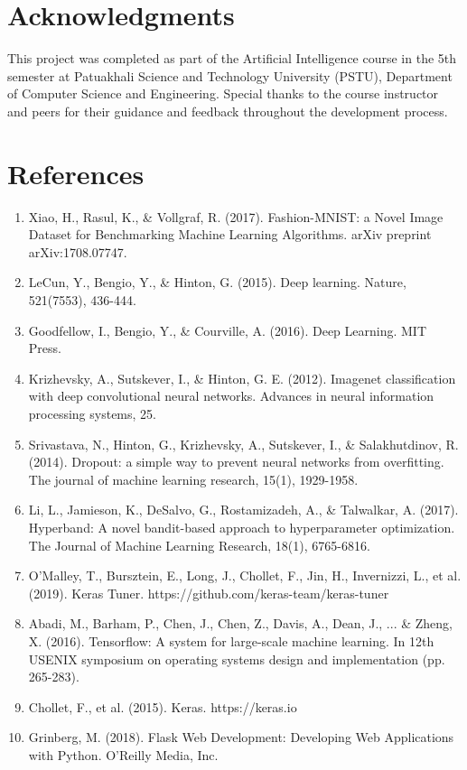 \documentclass[12pt,a4paper]{article}
\begin{document}
\section*{Acknowledgments}

This project was completed as part of the Artificial Intelligence course in the 5th semester at Patuakhali Science and Technology University (PSTU), Department of Computer Science and Engineering. Special thanks to the course instructor and peers for their guidance and feedback throughout the development process.

\section*{References}

\begin{enumerate}
    \item Xiao, H., Rasul, K., \& Vollgraf, R. (2017). Fashion-MNIST: a Novel Image Dataset for Benchmarking Machine Learning Algorithms. arXiv preprint arXiv:1708.07747.
    
    \item LeCun, Y., Bengio, Y., \& Hinton, G. (2015). Deep learning. Nature, 521(7553), 436-444.
    
    \item Goodfellow, I., Bengio, Y., \& Courville, A. (2016). Deep Learning. MIT Press.
    
    \item Krizhevsky, A., Sutskever, I., \& Hinton, G. E. (2012). Imagenet classification with deep convolutional neural networks. Advances in neural information processing systems, 25.
    
    \item Srivastava, N., Hinton, G., Krizhevsky, A., Sutskever, I., \& Salakhutdinov, R. (2014). Dropout: a simple way to prevent neural networks from overfitting. The journal of machine learning research, 15(1), 1929-1958.
    
    \item Li, L., Jamieson, K., DeSalvo, G., Rostamizadeh, A., \& Talwalkar, A. (2017). Hyperband: A novel bandit-based approach to hyperparameter optimization. The Journal of Machine Learning Research, 18(1), 6765-6816.
    
    \item O'Malley, T., Bursztein, E., Long, J., Chollet, F., Jin, H., Invernizzi, L., et al. (2019). Keras Tuner. https://github.com/keras-team/keras-tuner
    
    \item Abadi, M., Barham, P., Chen, J., Chen, Z., Davis, A., Dean, J., ... \& Zheng, X. (2016). Tensorflow: A system for large-scale machine learning. In 12th USENIX symposium on operating systems design and implementation (pp. 265-283).
    
    \item Chollet, F., et al. (2015). Keras. https://keras.io
    
    \item Grinberg, M. (2018). Flask Web Development: Developing Web Applications with Python. O'Reilly Media, Inc.
\end{enumerate}
\end{document}
